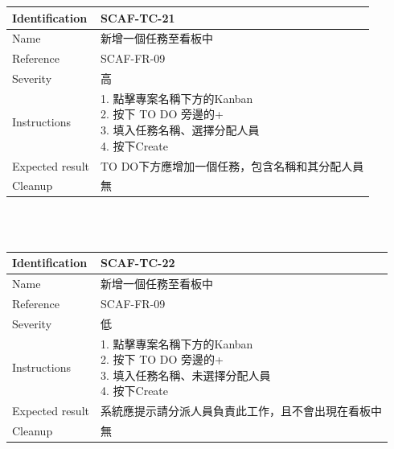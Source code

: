 \documentclass{report}
\begin{document}
\begin{tabularx}{\textwidth}{
  |p{}%
  |p{}|%
  }
  \hline
  \centering Identification &  SCAF-TC-21 \\
  \hline
  \centering Name & 新增一個任務至看板中 \\
  \hline
  \centering Reference & SCAF-FR-09 \\
  \hline
  \centering Severity & 高 \\
  \hline
  \centering Instructions & 
  \makecell[l]{
    1. 點擊專案名稱下方的Kanban  \\
    2. 按下 TO DO 旁邊的+  \\
    3. 填入任務名稱、選擇分配人員  \\
    4. 按下Create
  }\\
  \hline
  \centering Expected result & TO DO下方應增加一個任務，包含名稱和其分配人員 \\
  \hline
  \centering Cleanup & 無 \\
  \hline
\end{tabularx}
\\
\newline
\\
\begin{tabularx}{\textwidth}{
  |p{}%
  |p{}|%
  }
  \hline
  \centering Identification &  SCAF-TC-22 \\
  \hline
  \centering Name & 新增一個任務至看板中 \\
  \hline
  \centering Reference & SCAF-FR-09 \\
  \hline
  \centering Severity & 低 \\
  \hline
  \centering Instructions & 
  \makecell[l]{
    1. 點擊專案名稱下方的Kanban  \\
    2. 按下 TO DO 旁邊的+  \\
    3. 填入任務名稱、未選擇分配人員  \\
    4. 按下Create
  }\\
  \hline
  \centering Expected result & 系統應提示請分派人員負責此工作，且不會出現在看板中 \\
  \hline
  \centering Cleanup & 無 \\
  \hline
\end{tabularx}
\\
\newline
\\
\end{document}
